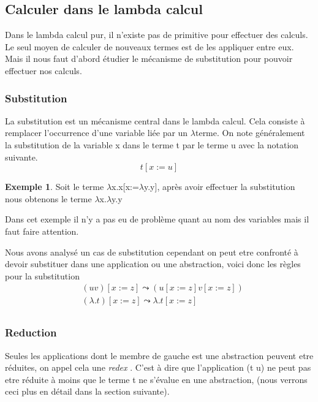 \documentclass {article}
\theoremstyle{definition}
\newtheorem{example}{Exemple}
\theoremstyle{remark}
\begin{document}
\subsection{Calculer dans le lambda calcul}

Dans le lambda calcul pur, il n'existe pas de primitive pour effectuer des 
calculs. Le seul moyen de calculer de nouveaux termes est de les appliquer 
entre eux. Mais il nous faut d'abord étudier le mécanisme de substitution pour 
pouvoir effectuer nos calculs.

\subsubsection{Substitution}

La substitution est un mécanisme central dans le lambda calcul. Cela consiste 
à remplacer l'occurrence d'une variable liée par un \(\lambda\)terme.
On note généralement la substitution de la variable x dans le terme t par le 
terme u avec la notation suivante. 
\[ 
t[x:=u]
\]

\begin{example}
  Soit le terme \(\lambda\)x.x[x:=\(\lambda\)y.y], après avoir effectuer la
  substitution nous obtenons le terme \(\lambda\)x.\(\lambda\)y.y
\end{example}
Dans cet exemple il n'y a pas eu de problème quant au nom des variables mais il faut 
faire attention. 

Nous avons analysé un cas de substitution cependant on peut etre confronté 
à devoir substituer dans une application ou une abstraction, voici donc 
les règles pour la substitution 
\begin{align*}
&(u v)[x := z]\leadsto(u[x := z] v[x := z]) \\
&(\lambda .t)[x := z]\leadsto\lambda .t[x := z] \\
\end{align*}

\subsubsection{Reduction}

Seules les applications dont le membre de gauche est une abstraction
peuvent etre réduites, on appel cela une \emph{redex} . 
C'est à dire que l'application (t u) ne peut pas etre réduite à moins 
que le terme t ne s'évalue en une abstraction, (nous verrons ceci plus
en détail dans la section suivante).
\end{document}
